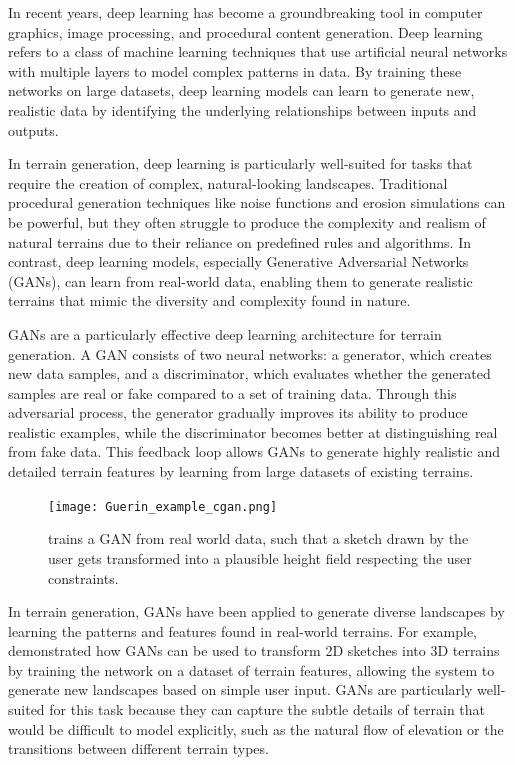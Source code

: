 In recent years, deep learning has become a groundbreaking tool in computer graphics, image processing, and procedural content generation. Deep learning refers to a class of machine learning techniques that use artificial neural networks with multiple layers to model complex patterns in data. By training these networks on large datasets, deep learning models can learn to generate new, realistic data by identifying the underlying relationships between inputs and outputs.


In terrain generation, deep learning is particularly well-suited for tasks that require the creation of complex, natural-looking landscapes. Traditional procedural generation techniques like noise functions and erosion simulations can be powerful, but they often struggle to produce the complexity and realism of natural terrains due to their reliance on predefined rules and algorithms. In contrast, deep learning models, especially Generative Adversarial Networks (GANs), can learn from real-world data, enabling them to generate realistic terrains that mimic the diversity and complexity found in nature.

GANs are a particularly effective deep learning architecture for terrain generation. A GAN consists of two neural networks: a generator, which creates new data samples, and a discriminator, which evaluates whether the generated samples are real or fake compared to a set of training data. Through this adversarial process, the generator gradually improves its ability to produce realistic examples, while the discriminator becomes better at distinguishing real from fake data. This feedback loop allows GANs to generate highly realistic and detailed terrain features by learning from large datasets of existing terrains.

\begin{figure}
    \texttt{[image: Guerin\_example\_cgan.png]}
    \caption{\cite{Guerin2017} trains a GAN from real world data, such that a sketch drawn by the user gets transformed into a plausible height field respecting the user constraints.}
    \label{fig:coral-island-Guerin2017-example}
\end{figure}

In terrain generation, GANs have been applied to generate diverse landscapes by learning the patterns and features found in real-world terrains. For example, \citep{Guerin2017} demonstrated how GANs can be used to transform 2D sketches into 3D terrains by training the network on a dataset of terrain features, allowing the system to generate new landscapes based on simple user input. GANs are particularly well-suited for this task because they can capture the subtle details of terrain that would be difficult to model explicitly, such as the natural flow of elevation or the transitions between different terrain types.

